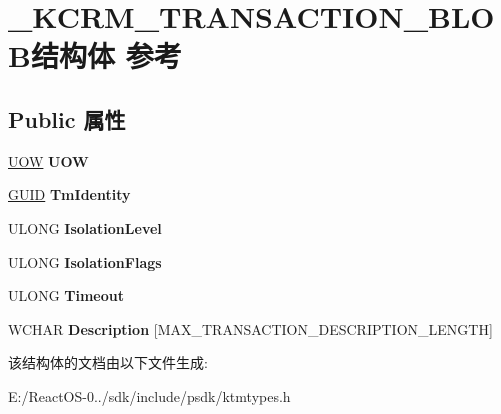 \hypertarget{struct___k_c_r_m___t_r_a_n_s_a_c_t_i_o_n___b_l_o_b}{}\section{\+\_\+\+K\+C\+R\+M\+\_\+\+T\+R\+A\+N\+S\+A\+C\+T\+I\+O\+N\+\_\+\+B\+L\+O\+B结构体 参考}
\label{struct___k_c_r_m___t_r_a_n_s_a_c_t_i_o_n___b_l_o_b}
\subsection*{Public 属性}
\begin{DoxyCompactItemize}
\item 
\mbox{\label{struct___k_c_r_m___t_r_a_n_s_a_c_t_i_o_n___b_l_o_b_a77d6d82a98651d1f74c868bec777be89}} 
\hyperlink{interface_g_u_i_d}{U\+OW} {\bfseries U\+OW}
\item 
\mbox{\label{struct___k_c_r_m___t_r_a_n_s_a_c_t_i_o_n___b_l_o_b_a02dc73635daf65f9ac4be90c61a1de62}} 
\hyperlink{interface_g_u_i_d}{G\+U\+ID} {\bfseries Tm\+Identity}
\item 
\mbox{\label{struct___k_c_r_m___t_r_a_n_s_a_c_t_i_o_n___b_l_o_b_a2b1b149373adc41fa89d3b8dab92a24d}} 
U\+L\+O\+NG {\bfseries Isolation\+Level}
\item 
\mbox{\label{struct___k_c_r_m___t_r_a_n_s_a_c_t_i_o_n___b_l_o_b_ac8078420fc6f47d798b467576dbe83ee}} 
U\+L\+O\+NG {\bfseries Isolation\+Flags}
\item 
\mbox{\label{struct___k_c_r_m___t_r_a_n_s_a_c_t_i_o_n___b_l_o_b_ad30b7f2512ba9f91ba82d6be83bb2d96}} 
U\+L\+O\+NG {\bfseries Timeout}
\item 
\mbox{\label{struct___k_c_r_m___t_r_a_n_s_a_c_t_i_o_n___b_l_o_b_abd38ddb4a39229ed4a91c11d4633cb85}} 
W\+C\+H\+AR {\bfseries Description} \mbox{[}M\+A\+X\+\_\+\+T\+R\+A\+N\+S\+A\+C\+T\+I\+O\+N\+\_\+\+D\+E\+S\+C\+R\+I\+P\+T\+I\+O\+N\+\_\+\+L\+E\+N\+G\+TH\mbox{]}
\end{DoxyCompactItemize}


该结构体的文档由以下文件生成\+:\begin{DoxyCompactItemize}
\item 
E\+:/\+React\+O\+S-\/0../sdk/include/psdk/ktmtypes.\+h\end{DoxyCompactItemize}
